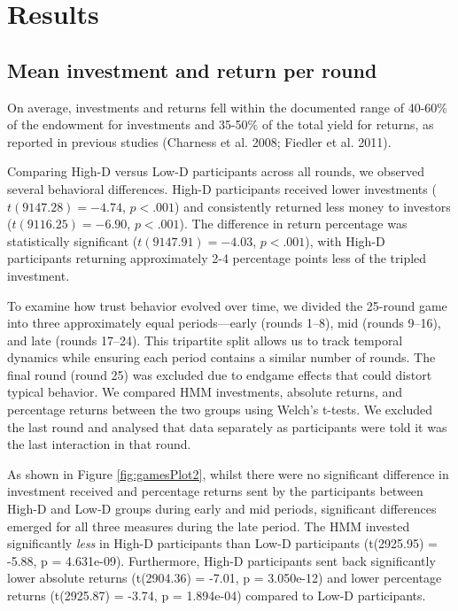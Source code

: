 \documentclass[
]{article}
\begin{document}
\section{Results}\label{results}

\subsection{Mean investment and return per round}\label{mean-investment-and-return-per-round}

On average, investments and returns fell within the documented range of 40-60\% of the endowment for investments and 35-50\% of the total yield for returns, as reported in previous studies (Charness et al. 2008; Fiedler et al. 2011).

Comparing High-D versus Low-D participants across all rounds, we observed several behavioral differences.
High-D participants received lower investments (\(t(9147.28) = -4.74\), \(p < .001\)) and consistently returned less money to investors (\(t(9116.25) = -6.90\), \(p < .001\)).
The difference in return percentage was statistically significant (\(t(9147.91) = -4.03\), \(p < .001\)), with High-D participants returning approximately 2-4 percentage points less of the tripled investment.

To examine how trust behavior evolved over time, we divided the 25-round game into three approximately equal periods---early (rounds 1--8), mid (rounds 9--16), and late (rounds 17--24).
This tripartite split allows us to track temporal dynamics while ensuring each period contains a similar number of rounds.
The final round (round 25) was excluded due to endgame effects that could distort typical behavior.
We compared HMM investments, absolute returns, and percentage returns between the two groups using Welch's t-tests.
We excluded the last round and analysed that data separately as participants were told it was the last interaction in that round.

As shown in Figure \ref{fig:gamesPlot2}, whilst there were no significant difference in investment received and percentage returns sent by the participants between High-D and Low-D groups during early and mid periods, significant differences emerged for all three measures during the late period.
The HMM invested significantly \emph{less} in High-D participants than Low-D participants (t(2925.95) = -5.88, p = 4.631e-09). Furthermore, High-D participants sent back significantly lower absolute returns (t(2904.36) = -7.01, p = 3.050e-12) and lower percentage returns (t(2925.87) = -3.74, p = 1.894e-04) compared to Low-D participants.
\end{document}
